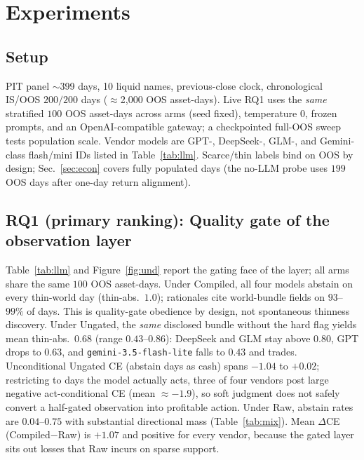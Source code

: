 \documentclass[sigconf,anonymous]{acmart}
\theoremstyle{acmdefinition}%
\theoremstyle{acmplain}%
\begin{document}
\section{Experiments}
\label{sec:exp}

\subsection{Setup}
PIT panel \(\sim\)399 days, 10 liquid names, previous-close clock, chronological IS/OOS \(200/200\) days (\(\approx\)2{,}000 OOS asset-days). Live RQ1 uses the \emph{same} stratified \(100\) OOS asset-days across arms (seed fixed), temperature \(0\), frozen prompts, and an OpenAI-compatible gateway; a checkpointed full-OOS sweep tests population scale. Vendor models are GPT-, DeepSeek-, GLM-, and Gemini-class flash/mini IDs listed in Table~\ref{tab:llm}. Scarce/thin labels bind on OOS by design; Sec.~\ref{sec:econ} covers fully populated days (the no-LLM probe uses \(199\) OOS days after one-day return alignment).

\subsection{RQ1 (primary ranking): Quality gate of the observation layer}
Table~\ref{tab:llm} and Figure~\ref{fig:und} report the gating face of the layer; all arms share the same \(100\) OOS asset-days. Under Compiled, all four models abstain on every thin-world day (thin-abs.\ \(1.0\)); rationales cite world-bundle fields on \(93\)--\(99\%\) of days. This is quality-gate obedience by design, not spontaneous thinness discovery. Under Ungated, the \emph{same} disclosed bundle without the hard flag yields mean thin-abs.\ \(0.68\) (range \(0.43\)--\(0.86\)): DeepSeek and GLM stay above \(0.80\), GPT drops to \(0.63\), and \texttt{gemini-3.5-flash-lite} falls to \(0.43\) and trades. Unconditional Ungated CE (abstain days as cash) spans \(-1.04\) to \(+0.02\); restricting to days the model actually acts, three of four vendors post large negative act-conditional CE (mean \({\approx}{-}1.9\)), so soft judgment does not safely convert a half-gated observation into profitable action. Under Raw, abstain rates are \(0.04\)--\(0.75\) with substantial directional mass (Table~\ref{tab:mix}). Mean \(\Delta\)CE (Compiled$-$Raw) is \(+1.07\) and positive for every vendor, because the gated layer sits out losses that Raw incurs on sparse support.
\end{document}
